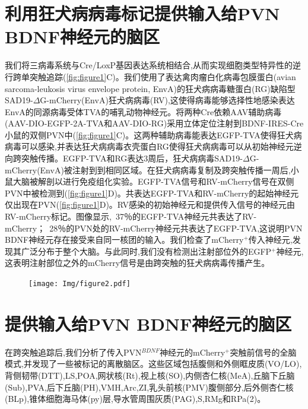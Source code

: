 \section{利用狂犬病病毒标记提供输入给PVN BDNF神经元的脑区}
我们将三病毒系统与Cre/LoxP基因表达系统\citep{wickersham2007monosynaptic}相结合,从而实现细胞类型特异性的逆行跨单突触追踪(\figurename{\ref{fig:figure1}C})。我们使用了表达禽肉瘤白化病毒包膜蛋白(avian sarcoma-leukosis virus envelope protein, EnvA)的狂犬病病毒糖蛋白(RG)缺陷型SAD19-$\Delta$G-mCherry(EnvA)狂犬病病毒(RV),这使得病毒能够选择性地感染表达EnvA的同源病毒受体TVA的哺乳动物神经元。将两种Cre依赖AAV辅助病毒(AAV-DIO-EGFP-2A-TVA和AAV-DIO-RG)采用立体定位注射到BDNF-IRES-Cre小鼠的双侧PVN中(\figurename{\ref{fig:figure1}C})。这两种辅助病毒能表达EGFP-TVA使得狂犬病病毒可以感染,并表达狂犬病病毒衣壳蛋白RG使得狂犬病病毒可以从初始神经元逆向跨突触传播。EGFP-TVA和RG表达3周后，狂犬病病毒SAD19-$\Delta$G-mCherry(EnvA)被注射到到相同区域。在狂犬病病毒复制及跨突触传播一周后,小鼠大脑被解剖以进行免疫组化实验。EGFP-TVA信号和RV-mCherry信号在双侧PVN中被检测到(\figurename{\ref{fig:figure1}D})。共表达EGFP-TVA和RV-mCherry的起始神经元仅出现在PVN(\figurename{\ref{fig:figure1}D})。RV感染的初始神经元和提供传入信号的神经元由RV-mCherry标记。图像显示,~37％的EGFP-TVA神经元共表达了RV-mCherry；~28％的PVN处的RV-mCherry神经元共表达了EGFP-TVA,这说明PVN BDNF神经元存在接受来自同一核团的输入。我们检查了mCherry$^{+}$传入神经元,发现其广泛分布于整个大脑。与此同时,我们没有检测出注射部位外的EGFP$^{+}$神经元,这表明注射部位之外的mCherry信号是由跨突触的狂犬病病毒传播产生。

\begin{figure}[!htbp]
    \centering
    \texttt{[image: Img/figure2.pdf]}
    \label{fig:figure2}
\end{figure}


\section{提供输入给PVN BDNF神经元的脑区}
在跨突触追踪后,我们分析了传入PVN$^{BDNF}$神经元的mCherry$^{+}$突触前信号的全脑模式,并发现了一些被标记的离散脑区。这些区域包括腹侧和外侧眶皮质(VO/LO),背侧韧带(DTT),LS,POA,网状核(Rt),视上核(SO),内侧杏仁核(MeA),丘脑下丘脑(Sub),PVA,后下丘脑(PH),VMH,Arc,ZI,乳头前核(PMV)腹侧部分,后外侧杏仁核(BLp),锥体细胞海马体(py)层,导水管周围灰质(PAG),S,RMg和RPa(\figurename{2})。

